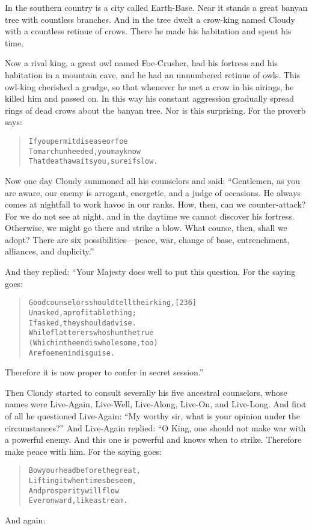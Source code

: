\documentclass[article, twoside, 14pt]{memoir}
\renewenvironment{verbatim}{%
\begin{quote}%
\vskip -10pt%
\begin{alltt}\normalfont\large}{\end{alltt}%
\end{quote}%
\vskip -10pt
} %
\begin{document}
In the southern country is a city called Earth-Base.
\label{s47}Near it stands a great banyan tree with countless
branches. And in the tree dwelt a crow-king named Cloudy with a
countless retinue of crows. There he made his habitation and spent
his time.

Now a rival king, a great owl named Foe-Crusher, had his fortress
and his habitation in a mountain cave, and he had an unnumbered
retinue of owls. This owl-king cherished a grudge, so that whenever
he met a crow in his airings, he killed him and passed on. In this
way his constant aggression gradually spread rings of dead crows
about the banyan tree. Nor is this surprising. For the proverb
says:

\begin{verbatim}
If you permit disease or foe
To march unheeded, you may know
That death awaits you, sure if slow.
\end{verbatim}
Now one day Cloudy summoned all his counselors and said:
``Gentlemen, as you are aware, our enemy is arrogant, energetic, and a judge of occasions. He always comes at nightfall to work havoc in our ranks. How, then, can we counter-attack? For we do not see at night, and in the daytime we cannot discover his fortress. Otherwise, we might go there and strike a blow. What course, then, shall we adopt? There are six possibilities---peace, war, change of base, entrenchment, alliances, and duplicity.''

And they replied: “Your Majesty does well to put this question. For
the saying goes:

\begin{verbatim}
Good counselors should tell their king,                 [236]
Unasked, a profitable thing;
    If asked, they should advise.
While flatterers who shun the true
(Which in the end is wholesome, too)
    Are foemen in disguise.
\end{verbatim}
Therefore it is now proper to confer in secret session.”

Then Cloudy started to consult severally his five ancestral
counselors, whose names were Live-Again, Live-Well, Live-Along,
Live-On, and Live-Long. And first of all he questioned Live-Again:
``My worthy sir, what is your opinion under the circumstances?''
And Live-Again replied: “O King, one should not make war with a
powerful enemy. And this one is powerful and knows when to strike.
Therefore make peace with him. For the saying goes:

\begin{verbatim}
Bow your head before the great,
    Lifting it when times beseem,
And prosperity will flow
    Ever onward, like a stream.
\end{verbatim}
And again:
\end{document}
